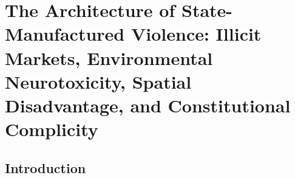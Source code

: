 \documentclass[
]{article}
\author{Emmanuel Theodore}
\date{}
\begin{document}
\section{\texorpdfstring{\textbf{The Architecture of State-Manufactured
Violence: Illicit Markets, Environmental Neurotoxicity, Spatial
Disadvantage, and Constitutional Complicity}}{The Architecture of State-Manufactured Violence: Illicit Markets, Environmental Neurotoxicity, Spatial Disadvantage, and Constitutional Complicity}}\label{the-architecture-of-state-manufactured-violence}

\subsection{\texorpdfstring{\textbf{Introduction}}{Introduction}}\label{introduction}
\end{document}
